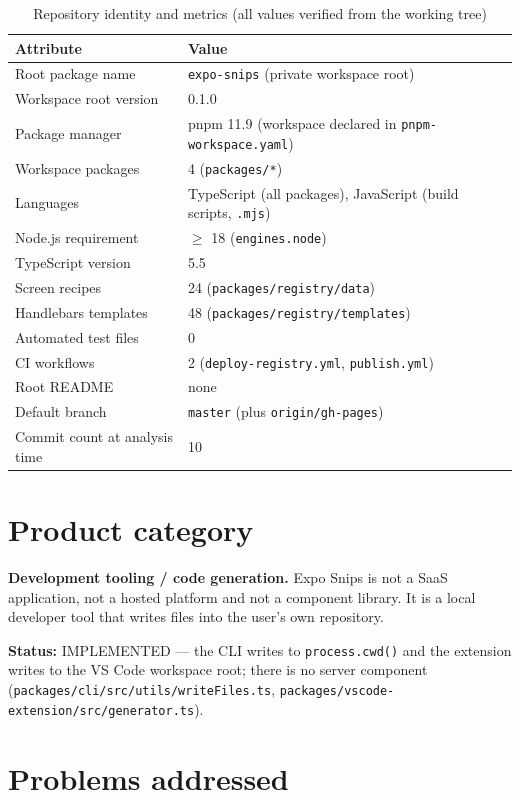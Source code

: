 \begin{table}[H]
\centering
\caption{Repository identity and metrics (all values verified from the working tree)}
\begin{tabular}{p{5.4cm}p{9cm}}
\toprule
\textbf{Attribute} & \textbf{Value} \\
\midrule
Root package name & \texttt{expo-snips} (private workspace root) \\
Workspace root version & 0.1.0 \\
Package manager & pnpm 11.9 (workspace declared in \texttt{pnpm-workspace.yaml}) \\
Workspace packages & 4 (\texttt{packages/*}) \\
Languages & TypeScript (all packages), JavaScript (build scripts, \texttt{.mjs}) \\
Node.js requirement & $\geq$ 18 (\texttt{engines.node}) \\
TypeScript version & 5.5 \\
Screen recipes & 24 (\texttt{packages/registry/data}) \\
Handlebars templates & 48 (\texttt{packages/registry/templates}) \\
Automated test files & 0 \\
CI workflows & 2 (\texttt{deploy-registry.yml}, \texttt{publish.yml}) \\
Root README & none \\
Default branch & \texttt{master} (plus \texttt{origin/gh-pages}) \\
Commit count at analysis time & 10 \\
\bottomrule
\end{tabular}
\end{table}

\section{Product category}

\textbf{Development tooling / code generation.} Expo Snips is not a SaaS
application, not a hosted platform and not a component library. It is a local
developer tool that writes files into the user's own repository.

\textbf{Status:} IMPLEMENTED --- the CLI writes to \texttt{process.cwd()} and the
extension writes to the VS Code workspace root; there is no server component
(\texttt{packages/cli/src/utils/writeFiles.ts},
\texttt{packages/vscode-extension/src/generator.ts}).

\section{Problems addressed}

